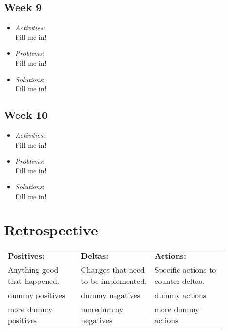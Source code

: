 \documentclass[compsoc,draftclsnofoot,onecolumn,10pt]{IEEEtran}
\begin{document}
   
\subsection{Week 9}
	\begin{itemize}
        \item \textit{Activities}:\\
        Fill me in!
        \item \textit{Problems}:\\
        Fill me in!
        \item \textit{Solutions}:\\
        Fill me in!
	\end{itemize}
   
   
\subsection{Week 10}
	\begin{itemize}
        \item \textit{Activities}:\\
        Fill me in!
        \item \textit{Problems}:\\
        Fill me in!
        \item \textit{Solutions}:\\
        Fill me in!
	\end{itemize}
   
   
\section{Retrospective}
	\begin{center}
		\begin{tabular}{|p{0.3\linewidth}|p{0.3\linewidth}|p{0.3\linewidth}|}
			\hline
			\textbf{Positives:} & \textbf{Deltas:} & \textbf{Actions:}\\
			
            Anything good that happened. & Changes that need to be implemented. & Specific actions to counter deltas.\\
			\hline

			dummy positives & dummy negatives & dummy actions\\
			\hline
			more dummy positives & moredummy negatives & more dummy actions\\
			\hline
			
		\end{tabular}
	\end{center}
\end{document}
